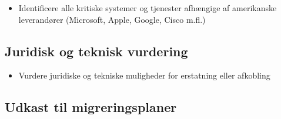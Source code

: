 \documentclass[a4paper,11pt]{book}
\begin{document}
\begin{itemize}
\tightlist
\item
  Identificere alle kritiske systemer og tjenester afhængige af
  amerikanske leverandører (Microsoft, Apple, Google, Cisco m.fl.)
\end{itemize}

\subsection{Juridisk og teknisk
vurdering}\label{juridisk-og-teknisk-vurdering}

\begin{itemize}
\tightlist
\item
  Vurdere juridiske og tekniske muligheder for erstatning eller
  afkobling
\end{itemize}

\subsection{Udkast til
migreringsplaner}\label{udkast-til-migreringsplaner}
\end{document}
